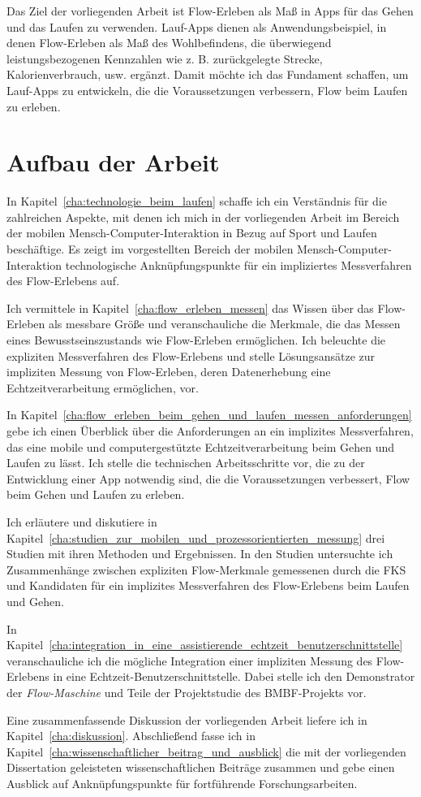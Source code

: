 Das Ziel der vorliegenden Arbeit ist Flow-Erleben als Maß in Apps für das Gehen und das Laufen zu verwenden. Lauf-Apps dienen als Anwendungsbeispiel, in denen Flow-Erleben als Maß des Wohlbefindens, die überwiegend leistungsbezogenen Kennzahlen wie z. B. zurückgelegte Strecke, Kalorienverbrauch, usw. ergänzt. Damit möchte ich das Fundament schaffen, um Lauf-Apps zu entwickeln, die die Voraussetzungen verbessern, Flow beim Laufen zu erleben.

\section{Aufbau der Arbeit}

In Kapitel~\ref{cha:technologie_beim_laufen} schaffe ich ein Verständnis für die zahlreichen Aspekte, mit denen ich mich in der vorliegenden Arbeit im Bereich der mobilen Mensch-Computer-Interaktion in Bezug auf Sport und Laufen beschäftige. Es zeigt im vorgestellten Bereich der mobilen Mensch-Computer-Interaktion technologische Anknüpfungspunkte für ein impliziertes Messverfahren des Flow-Erlebens auf.

Ich vermittele in Kapitel~\ref{cha:flow_erleben_messen} das Wissen über das Flow-Erleben als messbare Größe und veranschauliche die Merkmale, die das Messen eines Bewusstseinszustands wie Flow-Erleben ermöglichen. Ich beleuchte die expliziten Messverfahren des Flow-Erlebens und stelle Lösungsansätze zur impliziten Messung von Flow-Erleben, deren Datenerhebung eine Echtzeitverarbeitung ermöglichen, vor.

In Kapitel~\ref{cha:flow_erleben_beim_gehen_und_laufen_messen_anforderungen} gebe ich einen Überblick über die Anforderungen an ein implizites Messverfahren, das eine mobile und computergestützte Echtzeitverarbeitung beim Gehen und Laufen zu lässt. Ich stelle die technischen Arbeitsschritte vor, die zu der Entwicklung einer App notwendig sind, die die Voraussetzungen verbessert, Flow beim Gehen und Laufen zu erleben.

Ich erläutere und diskutiere in Kapitel~\ref{cha:studien_zur_mobilen_und_prozessorientierten_messung} drei Studien mit ihren Methoden und Ergebnissen. In den Studien untersuchte ich Zusammenhänge zwischen expliziten Flow-Merkmale gemessenen durch die \ac{FKS} und Kandidaten für ein implizites Messverfahren des Flow-Erlebens beim Laufen und Gehen.

In Kapitel~\ref{cha:integration_in_eine_assistierende_echtzeit_benutzerschnittstelle} veranschauliche ich die mögliche Integration einer impliziten Messung des Flow-Erlebens in eine Echtzeit-Benutzerschnittstelle. Dabei stelle ich den Demonstrator der \emph{Flow-Maschine} und Teile der Projektstudie des \acs{BMBF}-Projekts vor. \pagebreak

Eine zusammenfassende Diskussion der vorliegenden Arbeit liefere ich in Kapitel~\ref{cha:diskussion}. Abschließend fasse ich in Kapitel~\ref{cha:wissenschaftlicher_beitrag_und_ausblick} die mit der vorliegenden Dissertation geleisteten wissenschaftlichen Beiträge zusammen und gebe einen Ausblick auf Anknüpfungspunkte für fortführende Forschungsarbeiten.
